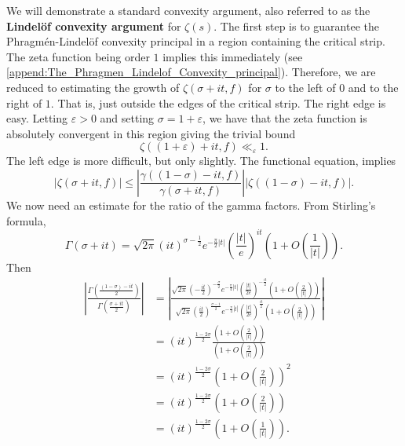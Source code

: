 \documentclass[12pt]{book}
\theoremstyle{definition}\newframedtheorem{method}{Method}
\newcommand{\g}{\gamma}
\newcommand{\z}{\zeta}
\newcommand{\s}{\sigma}
\newcommand{\G}{\Gamma}
\newcommand{\e}{\varepsilon}
\newcommand{\<}{\langle}
\renewcommand{\>}{\rangle}
\begin{document}
    We will demonstrate a standard convexity argument, also referred to as the \textbf{Lindel\"of convexity argument} for $\z(s)$. The first step is to guarantee the Phragm\'en-Lindel\"of convexity principal in a region containing the critical strip. The zeta function being order $1$ implies this immediately (see \cref{append:The_Phragmen_Lindelof_Convexity_principal}). Therefore, we are reduced to estimating the growth of $\z(\s+it,f)$ for $\s$ to the left of $0$ and to the right of $1$. That is, just outside the edges of the critical strip. The right edge is easy. Letting $\e > 0$ and setting $\s = 1+\e$, we have that the zeta function is absolutely convergent in this region giving the trivial bound
    \begin{equation}\label{equ:convexity_bound_1}
      \z((1+\e)+it,f) \ll_{\e} 1.
    \end{equation}
    The left edge is more difficult, but only slightly. The functional equation, implies
    \begin{equation}\label{equ:convexity_bound_left_edge}
      |\z(\s+it,f)| \le \left|\frac{\g((1-\s)-it,f)}{\g(\s+it,f)}\right||\z((1-\s)-it,f)|.
    \end{equation}
    We now need an estimate for the ratio of the gamma factors. From Stirling's formula,
    \[
      \G(\s+it) = \sqrt{2\pi}(it)^{\s-\frac{1}{2}}e^{-\frac{\pi}{2}|t|}\left(\frac{|t|}{e}\right)^{it}\left(1+O\left(\frac{1}{|t|}\right)\right).
    \]
    Then
    \begin{align*}
      \left|\frac{\G\left(\frac{(1-\s)-it}{2}\right)}{\G\left(\frac{\s+it}{2}\right)}\right| &= \left|\frac{\sqrt{2\pi}\left(-\frac{it}{2}\right)^{-\frac{\s}{2}}e^{-\frac{\pi}{4}|t|}\left(\frac{|t|}{2e}\right)^{-\frac{it}{2}}\left(1+O\left(\frac{2}{|t|}\right)\right)}{\sqrt{2\pi}\left(\frac{it}{2}\right)^{\frac{\s-1}{2}}e^{-\frac{\pi}{4}|t|}\left(\frac{|t|}{2e}\right)^{\frac{it}{2}}\left(1+O\left(\frac{2}{|t|}\right)\right)}\right| \\
      &= (it)^{\frac{1-2\s}{2}}\frac{\left(1+O\left(\frac{2}{|t|}\right)\right)}{\left(1+O\left(\frac{2}{|t|}\right)\right)} \\
      &= (it)^{\frac{1-2\s}{2}}\left(1+O\left(\frac{2}{|t|}\right)\right)^{2} \\
      &= (it)^{\frac{1-2\s}{2}}\left(1+O\left(\frac{2}{|t|}\right)\right) \\
      &= (it)^{\frac{1-2\s}{2}}\left(1+O\left(\frac{1}{|t|}\right)\right).
    \end{align*}
\end{document}
